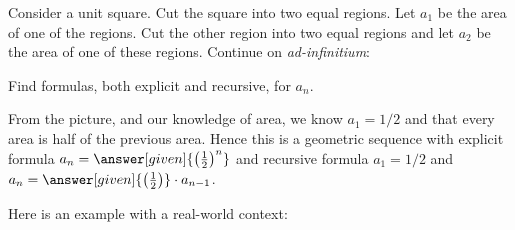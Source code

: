 \documentclass{ximera}
\begin{document}
\begin{example}
  Consider a unit square. Cut the square into two equal regions. Let
  $a_1$ be the area of one of the regions. Cut the other region into
  two equal regions and let $a_2$ be the area of one of these
  regions. Continue on \textit{ad-infinitium}:
  \begin{image}
  \end{image}
  Find formulas, both explicit and recursive, for $a_n$.
  \begin{explanation}
    From the picture, and our knowledge of area, we know $a_1 = 1/2$
    and that every area is half of the previous area. Hence this is a
    geometric sequence with explicit formula $a_n =
    \answer[given]{\left(\frac{1}{2}\right)^{n}}$ and recursive
    formula $a_1 = 1/2$ and $a_n =
    \answer[given]{\left(\frac{1}{2}\right)}\cdot a_{n-1}$.
  \end{explanation}
\end{example}

Here is an example with a real-world context:
\end{document}

